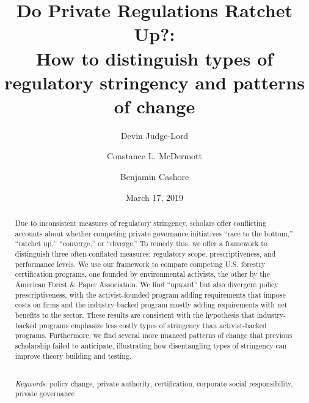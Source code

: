 \documentclass[
      12pt,
        ]{article}
\title{Do Private Regulations Ratchet Up?: 
           \\ How to distinguish types of regulatory stringency and patterns of change}
\author{ %
            Devin Judge-Lord 
             \and 
            Constance L. McDermott 
             \and 
            Benjamin Cashore 
            }
\date{March 17, 2019}
\begin{document}
 


  \maketitle




  \begin{abstract}
    \noindent Due to inconsistent measures of regulatory stringency, scholars offer
conflicting accounts about whether competing private governance
initiatives ``race to the bottom,'' ``ratchet up,'' ``converge,'' or
``diverge.'' To remedy this, we offer a framework to distinguish three
often-conflated measures: regulatory scope, prescriptiveness, and
performance levels. We use our framework to compare competing U.S.
forestry certification programs, one founded by environmental activists,
the other by the American Forest \& Paper Association. We find
``upward'' but also divergent policy prescriptiveness, with the
activist-founded program adding requirements that impose costs on firms
and the industry-backed program mostly adding requirements with net
benefits to the sector. These results are consistent with the hypothesis
that industry-backed programs emphasize less costly types of stringency
than activist-backed programs. Furthermore, we find several more nuanced
patterns of change that previous scholarship failed to anticipate,
illustrating how disentangling types of stringency can improve theory
building and testing. 

          \hfill \\ 
      \noindent \emph{Keywords}: policy change, private authority, certification, corporate social
responsibility, private governance 
    
  \end{abstract}










\noindent 
      \doublespacing 
    
\newpage
\singlespacing 
\end{document}

